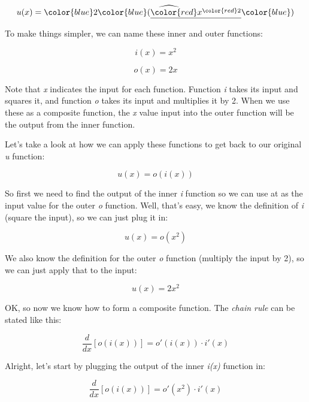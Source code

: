 \documentclass[11pt]{article}
\begin{document}
\begin{equation}u(x) = \widehat{\color{blue}2\color{blue}(\underline{\color{red}x^{\color{red}2}}\color{blue})} \end{equation}

To make things simpler, we can name these inner and outer functions:

\begin{equation}i(x) = x^{2} \end{equation}

\begin{equation}o(x) = 2x \end{equation}

Note that \emph{x} indicates the input for each function. Function
\emph{i} takes its input and squares it, and function \emph{o} takes its
input and multiplies it by 2. When we use these as a composite function,
the \emph{x} value input into the outer function will be the output from
the inner function.

Let's take a look at how we can apply these functions to get back to our
original \emph{u} function:

\begin{equation}u(x) = o(i(x)) \end{equation}

So first we need to find the output of the inner \emph{i} function so we
can use at as the input value for the outer \emph{o} function. Well,
that's easy, we know the definition of \emph{i} (square the input), so
we can just plug it in:

\begin{equation}u(x) = o(x^{2}) \end{equation}

We also know the definition for the outer \emph{o} function (multiply
the input by 2), so we can just apply that to the input:

\begin{equation}u(x) = 2x^{2} \end{equation}

OK, so now we know how to form a composite function. The \emph{chain
rule} can be stated like this:

\begin{equation}\frac{d}{dx}[o(i(x))] = o'(i(x)) \cdot i'(x)\end{equation}

Alright, let's start by plugging the output of the inner \emph{i(x)}
function in:

\begin{equation}\frac{d}{dx}[o(i(x))] = o'(x^{2}) \cdot i'(x)\end{equation}
\end{document}
